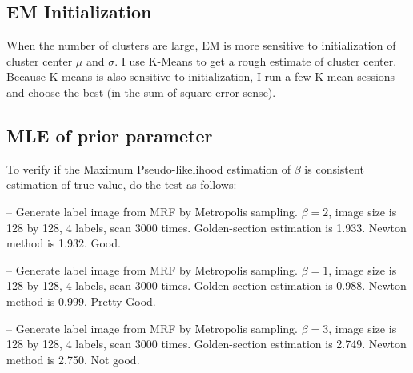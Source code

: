 \documentclass[12pt]{article}
\begin{document}
\subsection{EM Initialization}
When the number of clusters are large, EM is more sensitive to initialization of cluster center $\mu$ and $\sigma$. I use K-Means to get a rough estimate of cluster center. Because K-means is also sensitive to initialization, I run a few K-mean sessions and choose the best (in the sum-of-square-error sense).

\subsection{MLE of prior parameter}
To verify if the Maximum  Pseudo-likelihood estimation of $\beta$ is consistent estimation of true value, do the test as follows:

-- Generate label image from MRF by Metropolis sampling. $\beta = 2$, image size is 128 by 128, 4 labels, scan 3000 times. Golden-section estimation is 1.933. Newton method is 1.932. Good. 

-- Generate label image from MRF by Metropolis sampling. $\beta = 1$, image size is 128 by 128, 4 labels, scan 3000 times. Golden-section estimation is 0.988. Newton method is 0.999. Pretty Good. 

-- Generate label image from MRF by Metropolis sampling. $\beta = 3$, image size is 128 by 128, 4 labels, scan 3000 times. Golden-section estimation is 2.749. Newton method is 2.750. Not good.
\end{document}

